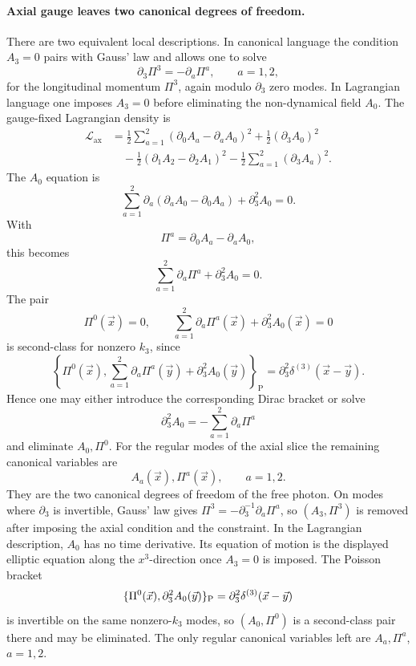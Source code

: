 \paragraph{Axial gauge leaves two canonical degrees of freedom.}
There are two equivalent local descriptions. In canonical language the
condition \(A_3=0\) pairs with Gauss' law and allows one to solve
\[
  \partial_3\Pi^3=-\partial_a\Pi^a,
  \qquad a=1,2,
\]
for the longitudinal momentum \(\Pi^3\), again modulo \(\partial_3\) zero
modes. In Lagrangian language one imposes \(A_3=0\) before eliminating the
non-dynamical field \(A_0\). The gauge-fixed Lagrangian density is
\[
\begin{aligned}
  \mathcal L_{\mathrm{ax}}
  &=
  \frac12\sum_{a=1}^2(\partial_0A_a-\partial_aA_0)^2
  +
  \frac12(\partial_3A_0)^2  \\
  &\quad
  -
  \frac12(\partial_1A_2-\partial_2A_1)^2
  -
  \frac12\sum_{a=1}^2(\partial_3A_a)^2 .
\end{aligned}
\]
The \(A_0\) equation is
\[
  \sum_{a=1}^2\partial_a(\partial_aA_0-\partial_0A_a)
  +\partial_3^2A_0=0.
\]
With
\[
  \Pi^a=\partial_0A_a-\partial_aA_0,
\]
this becomes
\[
  \sum_{a=1}^2\partial_a\Pi^a+\partial_3^2A_0=0.
\]
The pair
\[
  \Pi^0(\vec x)=0,
  \qquad
  \sum_{a=1}^2\partial_a\Pi^a(\vec x)+\partial_3^2A_0(\vec x)=0
\]
is second-class for nonzero \(k_3\), since
\[
  \left\{
    \Pi^0(\vec x),
    \sum_{a=1}^2\partial_a\Pi^a(\vec y)+\partial_3^2A_0(\vec y)
  \right\}_{\mathrm P}
  =
  \partial_3^2\delta^{(3)}(\vec x-\vec y).
\]
Hence one may either introduce the corresponding Dirac bracket or solve
\[
  \partial_3^2A_0
  =
  -\sum_{a=1}^2\partial_a\Pi^a
\]
and eliminate \(A_0,\Pi^0\). For the regular modes of the axial slice the
remaining canonical variables are
\[
  A_a(\vec x),\Pi^a(\vec x),
  \qquad a=1,2.
\]
They are the two canonical degrees of freedom of the free photon.
On modes where \(\partial_3\) is invertible, Gauss' law gives
\(\Pi^3=-\partial_3^{-1}\partial_a\Pi^a\), so \((A_3,\Pi^3)\) is removed
after imposing the axial condition and the constraint.  In the Lagrangian
description, \(A_0\) has no time derivative.  Its equation of motion is the
displayed elliptic equation along the \(x^3\)-direction once \(A_3=0\) is
imposed.  The Poisson bracket
\[
  \{\Pi^0(\vec x),\partial_3^2A_0(\vec y)\}_{\rm P}
  =
  \partial_3^2\delta^{(3)}(\vec x-\vec y)
\]
is invertible on the same nonzero-\(k_3\) modes, so
\((A_0,\Pi^0)\) is a second-class pair there and may be eliminated.  The only
regular canonical variables left are \(A_a,\Pi^a\), \(a=1,2\).

